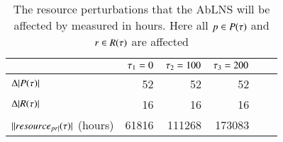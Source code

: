 \begin{table}[H]
	\centering
	\begin{tabular}{lrrrrr}
	\toprule
	                                     & $\tau_1 = 0$ & $\tau_2 = 100$ & $\tau_3 = 200$   \\ \midrule
	$\Delta |P(\tau)|$                & 52                     & 52                     & 52                     \\ \midrule
	$\Delta |R(\tau)|$              & 16                     & 16                     & 16                     \\ \midrule
	$ ||resource_{pr|}(\tau)|$ (hours) &  61816                 & 111268                 & 173083                 \\ \bottomrule
	\end{tabular}
	\caption{The resource perturbations that the AbLNS will be affected by measured in hours.
		Here all $p \in P(\tau)$ and $r \in R(\tau)$ are 
		affected
	}\label{tab:responses:resource-addition}
\end{table}
